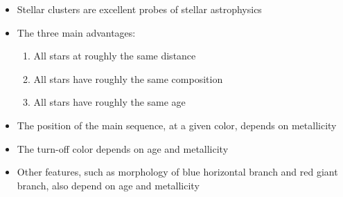 \documentclass[letterpaper,landscape]{slides}
\begin{document}
\begin{slide}
{\begin{minipage}[t]{12cm}
\begin{itemize}
\item Stellar clusters are excellent probes of stellar astrophysics
\item {\color{blue} The three main advantages:} 
   \begin{enumerate}
      \item All stars at roughly the same distance
      \item All stars have roughly the same composition
      \item All stars have roughly the same age
   \end{enumerate}
\item The position of the main sequence, at a given color, 
       depends on metallicity 
\item The turn-off color depends on age and metallicity 
\item Other features, such as morphology of blue horizontal 
   branch and red giant branch, also depend on age and metallicity 

\end{itemize}

\end{minipage}}
\vfill 
\end{slide}
\end{document}
